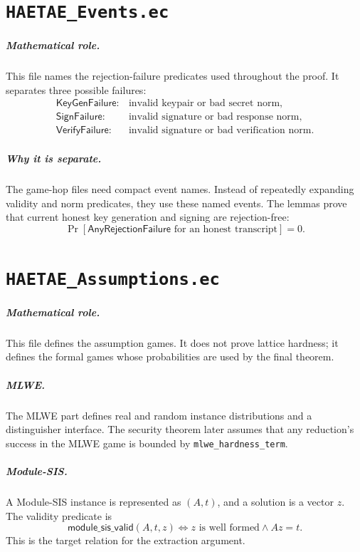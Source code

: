\documentclass[11pt]{report}
\newcommand{\ec}[1]{\nolinkurl{#1}}
\newcommand{\ecchapter}[2]{\chapter{\texorpdfstring{\texttt{#1}}{#2}}}
\theoremstyle{definition}
\theoremstyle{plain}
\theoremstyle{definition}
\begin{document}


\ecchapter{HAETAE\_Events.ec}{HAETAE Events.ec}

\paragraph{Mathematical role.}
This file names the rejection-failure predicates used throughout the proof.
It separates three possible failures:
\[
\begin{array}{ll}
\mathsf{KeyGenFailure}: & \text{invalid keypair or bad secret norm},\\
\mathsf{SignFailure}: & \text{invalid signature or bad response norm},\\
\mathsf{VerifyFailure}: & \text{invalid signature or bad verification norm}.
\end{array}
\]

\paragraph{Why it is separate.}
The game-hop files need compact event names.  Instead of repeatedly expanding
validity and norm predicates, they use these named events.  The lemmas prove
that current honest key generation and signing are rejection-free:
\[
  \Pr[\mathsf{AnyRejectionFailure}\text{ for an honest transcript}]=0.
\]



\ecchapter{HAETAE\_Assumptions.ec}{HAETAE Assumptions.ec}

\paragraph{Mathematical role.}
This file defines the assumption games.  It does not prove lattice hardness; it
defines the formal games whose probabilities are used by the final theorem.

\paragraph{MLWE.}
The MLWE part defines real and random instance distributions and a distinguisher
interface.  The security theorem later assumes that any reduction's success in
the MLWE game is bounded by \ec{mlwe_hardness_term}.

\paragraph{Module-SIS.}
A Module-SIS instance is represented as \((A,t)\), and a solution is a vector
\(z\).  The validity predicate is
\[
  \mathsf{module\_sis\_valid}(A,t,z)
  \Longleftrightarrow
  z\text{ is well formed}\land A z=t.
\]
This is the target relation for the extraction argument.
\end{document}
